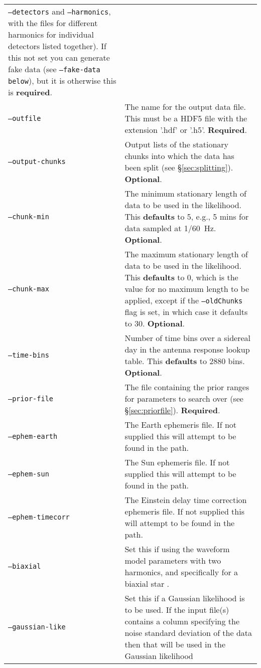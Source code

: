 \begin{footnotesize}
\begin{longtable}{|p{}p{}|}
                            {\tt --detectors} and {\tt --harmonics}, with the files for different harmonics for individual detectors listed together). If this not
                            set you can generate fake data (see {\tt --fake-data below}), but it is otherwise this is {\bf required}. \\
 {\tt --outfile}         &  The name for the output data file. This must be a HDF5 file with the extension '.hdf' or '.h5'. {\bf Required}. \\
 {\tt --output-chunks}   &  Output lists of the stationary chunks into which the data has been split (see \S\ref{sec:splitting}). {\bf Optional}. \\
 {\tt --chunk-min}       &  The minimum stationary length of data to be used in the likelihood. This {\bf defaults} to 5, e.g., 5 mins for data
                            sampled at 1/60~Hz. {\bf Optional}. \\
 {\tt --chunk-max}       &  The maximum stationary length of data to be used in the likelihood. This {\bf defaults} to 0, which is the value for no
                            maximum length to be applied, except if the {\tt --oldChunks} flag is set, in which case it defaults to 30. {\bf Optional}. \\
 {\tt --time-bins}       &  Number of time bins over a sidereal day in the antenna response lookup table. This {\bf defaults} to 2880 bins. {\bf Optional}. \\
 {\tt --prior-file}      &  The file containing the prior ranges for parameters to search over (see \S\ref{sec:priorfile}). {\bf Required}. \\
 {\tt --ephem-earth}     &  The Earth ephemeris file. If not supplied this will attempt to be found in the path. \\
 {\tt --ephem-sun}       &  The Sun ephemeris file. If not supplied this will attempt to be found in the path. \\
 {\tt --ephem-timecorr}  &  The Einstein delay time correction ephemeris file. If not supplied this will attempt to be found in the path. \\
 {\tt --biaxial}         &  Set this if using the waveform model parameters with two harmonics, and specifically for a biaxial star \citep[see, e.g.,][]{2015MNRAS.453.4399P}. \\
 {\tt --gaussian-like}   &  Set this if a Gaussian likelihood is to be used. If the input file(s) contains a column specifying
                            the noise standard deviation of the data then that will be used in the Gaussian likelihood

\end{longtable}
\end{footnotesize}
